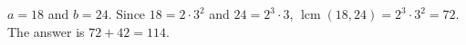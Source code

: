 $a=18$ and $b=24$. Since $18=2\cdot3^2$ and $24=2^3\cdot3$, $\operatorname{lcm}(18,24)=2^3\cdot3^2=72$. The answer is $72+42=\boxed{114}$.
